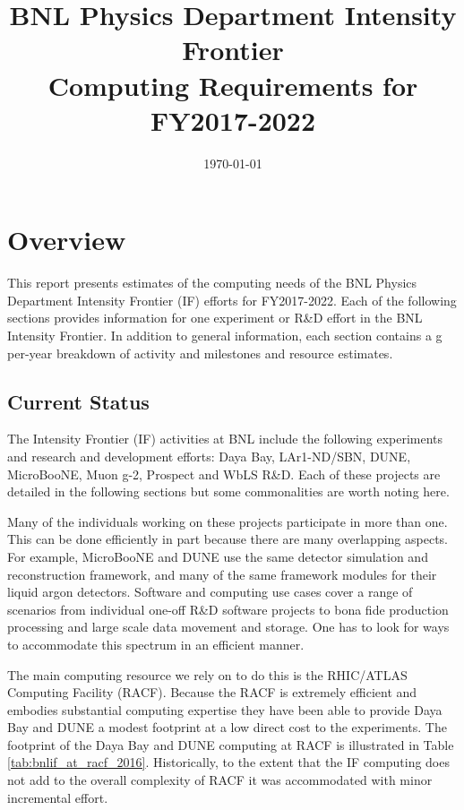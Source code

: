 \documentclass[pdftex,12pt,letter]{article}
\title{BNL Physics Department Intensity Frontier\\Computing Requirements for FY2017-2022}
\date{\today}
\begin{document}
\maketitle
\tableofcontents

%

\newpage
\section{Overview}
This report presents estimates of the computing needs of
the BNL Physics Department Intensity Frontier (IF) efforts for FY2017-2022.
Each of the following sections provides  information for one
experiment or R\&D effort in the BNL Intensity Frontier.
In addition to general information, each section contains a g per-year breakdown of activity and
milestones and resource estimates.

\subsection{Current Status}

The Intensity Frontier (IF) activities at BNL include the following
experiments and research and development efforts:
%
Daya Bay,
LAr1-ND/SBN,
DUNE,
MicroBooNE,
Muon g-2,
Prospect and
WbLS R\&D.
%
Each of these projects are detailed in the following sections but some
commonalities are worth noting here.

Many of the individuals working on these projects participate in more
than one.
This can be done efficiently in part because there are many
overlapping aspects.
For example, MicroBooNE and DUNE  use the same detector
simulation and reconstruction framework, and many of the same
framework modules for their liquid argon detectors.
Software and computing use cases cover a range of scenarios
from individual one-off R\&D software projects to bona fide production
processing and large scale data movement and storage.
One has to look for ways to accommodate this spectrum in an efficient
manner.  

The main computing resource  we rely on to do this is the RHIC/ATLAS Computing
Facility (RACF). Because the RACF is extremely efficient and embodies substantial computing
expertise they have been able to provide Daya
Bay and DUNE a modest footprint at a low direct cost to the experiments.
The footprint of the Daya Bay and DUNE computing at RACF is illustrated in Table \ref{tab:bnlif_at_racf_2016}.
Historically, to the extent that the IF computing does not add to the overall complexity of RACF it
was accommodated with minor incremental effort.
\end{document}
